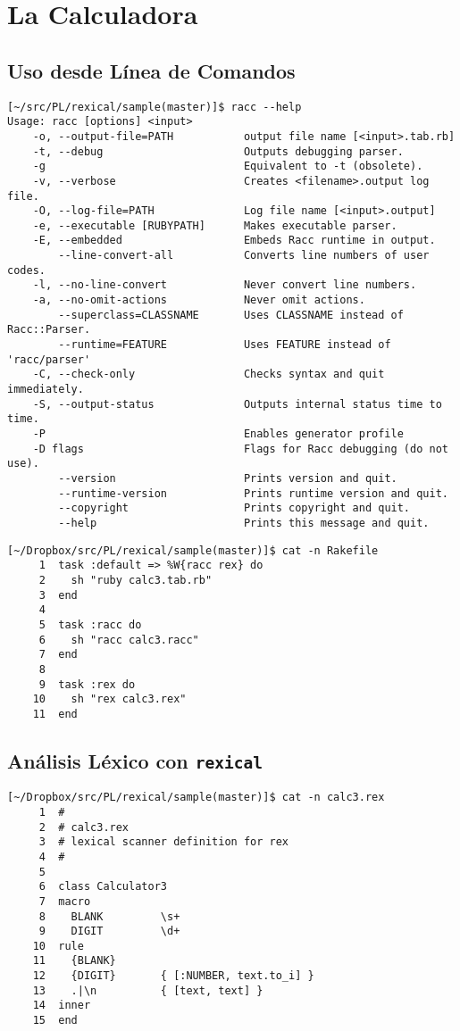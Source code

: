 
\section{La Calculadora}

\subsection{Uso desde Línea de Comandos}
\begin{verbatim}
[~/src/PL/rexical/sample(master)]$ racc --help
Usage: racc [options] <input>
    -o, --output-file=PATH           output file name [<input>.tab.rb]
    -t, --debug                      Outputs debugging parser.
    -g                               Equivalent to -t (obsolete).
    -v, --verbose                    Creates <filename>.output log file.
    -O, --log-file=PATH              Log file name [<input>.output]
    -e, --executable [RUBYPATH]      Makes executable parser.
    -E, --embedded                   Embeds Racc runtime in output.
        --line-convert-all           Converts line numbers of user codes.
    -l, --no-line-convert            Never convert line numbers.
    -a, --no-omit-actions            Never omit actions.
        --superclass=CLASSNAME       Uses CLASSNAME instead of Racc::Parser.
        --runtime=FEATURE            Uses FEATURE instead of 'racc/parser'
    -C, --check-only                 Checks syntax and quit immediately.
    -S, --output-status              Outputs internal status time to time.
    -P                               Enables generator profile
    -D flags                         Flags for Racc debugging (do not use).
        --version                    Prints version and quit.
        --runtime-version            Prints runtime version and quit.
        --copyright                  Prints copyright and quit.
        --help                       Prints this message and quit.

\end{verbatim}

\begin{verbatim}
[~/Dropbox/src/PL/rexical/sample(master)]$ cat -n Rakefile 
     1  task :default => %W{racc rex} do
     2    sh "ruby calc3.tab.rb"
     3  end
     4  
     5  task :racc do
     6    sh "racc calc3.racc"
     7  end
     8  
     9  task :rex do
    10    sh "rex calc3.rex"
    11  end
\end{verbatim}

\subsection{Análisis Léxico con {\tt rexical}}
\begin{verbatim}
[~/Dropbox/src/PL/rexical/sample(master)]$ cat -n calc3.rex
     1  #
     2  # calc3.rex
     3  # lexical scanner definition for rex
     4  #
     5  
     6  class Calculator3
     7  macro
     8    BLANK         \s+
     9    DIGIT         \d+
    10  rule
    11    {BLANK}
    12    {DIGIT}       { [:NUMBER, text.to_i] }
    13    .|\n          { [text, text] }
    14  inner
    15  end
\end{verbatim}

